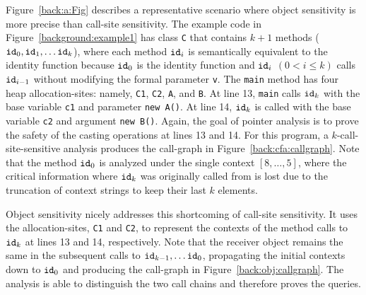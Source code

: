 


Figure~\ref{back:a:Fig} %
describes a representative scenario where
object sensitivity is more precise than call-site sensitivity.
The example code in Figure~\ref{background:example1} has class {\tt C}
that contains $k+1$ methods
(${\tt id}_0, {\tt id}_1, \dots {\tt id}_k$), where each method
${\tt id}_i$ is semantically equivalent to the identity function
because ${\tt id}_0$ is the identity function and ${\tt id}_i$
{$(0< i \le k)$} calls ${\tt id}_{i-1}$ without modifying the formal
parameter {\tt v}.  The {\tt main} method has four heap allocation-sites:
namely, \texttt{C1}, \texttt{C2}, \texttt{A}, and \texttt{B}.  At line
13, {\tt main} calls ${\tt id}_k$ with the base variable {\tt c1} and
parameter \texttt{new A()}. At line {14}, ${\tt id}_k$ is called with
the base variable {\tt c2} and argument \texttt{new B()}.  Again, the goal
of pointer analysis is to prove the safety of the casting
operations at lines 13 and 14. For this program, a
$k$-call-site-sensitive analysis produces the call-graph in
Figure~\ref{back:cfa:callgraph}. Note that the method ${\tt id}_0$ is analyzed
under the single context ${[8,\dots,5]}$, where the critical information where
${\tt id}_k$ was originally called from is lost due to the truncation of
context strings to keep their last $k$ elements. 

Object sensitivity nicely addresses this shortcoming of call-site sensitivity. It uses the
allocation-sites, {\tt C1} and {\tt C2}, to represent the contexts of the
method calls to ${\tt id}_k$ at lines 13 and {14}, respectively. Note that the
receiver object remains the same in the subsequent calls to ${\tt id}_{k-1},
\dots {\tt id}_0$, propagating the initial contexts down to ${\tt id}_0$ and
producing the call-graph in Figure~\ref{back:obj:callgraph}. The
analysis is able to distinguish the two call chains and therefore proves the
queries.





